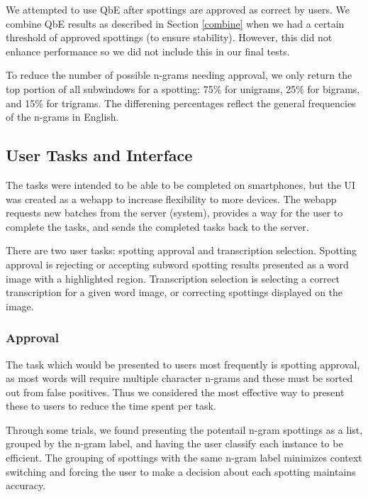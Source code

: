 \documentclass[ms,electronic,twosidetoc,letterpaper,chaptercenter,parttop,lof,lot]{byumsphd}
\begin{document}
We attempted to use QbE after spottings are approved as correct by users. We combine QbE results as described in Section \ref{combine} when we had a certain threshold of approved spottings (to ensure stability). However, this did not enhance performance so we did not include this in our final tests.

To reduce the number of possible n-grams needing approval, we only return the top portion of all subwindows for a spotting: 75\% for unigrams, 25\% for bigrams, and 15\% for trigrams. The differening percentages reflect the general frequencies of the n-grams in English.

\subsection{User Tasks and Interface}

The tasks were intended to be able to be completed on smartphones, but the UI was created as a webapp to increase flexibility to more devices. The webapp requests new batches from the server (system), provides a way for the user to complete the tasks, and sends the completed tasks back to the server.

There are two user tasks: spotting approval and transcription selection. Spotting approval is rejecting or accepting subword spotting results presented as a word image with a highlighted region. Transcription selection is selecting a correct transcription for a given word image, or correcting spottings displayed on the image. 

\subsubsection{Approval}

The task which would be presented to users most frequently is spotting approval, as most words will require multiple character n-grams and these must be sorted out from false positives. Thus we considered the most effective way to present these to users to reduce the time spent per task.


Through some trials, we found presenting the potentail n-gram spottings as a list, grouped by the n-gram label, and having the user classify each instance to be efficient. The grouping of spottings with the same n-gram label minimizes context switching and forcing the user to make a decision about each spotting maintains accuracy.
\end{document}
